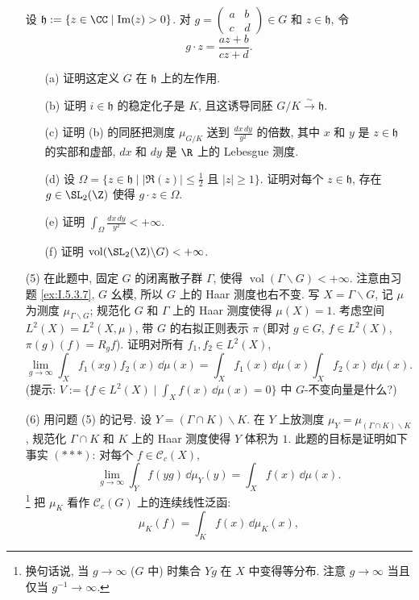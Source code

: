 \begin{enumerate}
设 $\mathfrak{h} := \{z \in \CC \mid \Im(z) > 0\}$.
对 $g = \begin{pmatrix} a & b \\ c & d \end{pmatrix} \in G$ 和 $z \in \mathfrak{h}$, 令
\[
g \cdot z = \frac{az + b}{cz + d}.
\]
\begin{enumerate}
\item[(a)] 证明这定义 $G$ 在 $\mathfrak{h}$ 上的左作用.
\item[(b)] 证明 $i \in \mathfrak{h}$ 的稳定化子是 $K$, 且这诱导同胚 $G/K \xrightarrow{\sim} \mathfrak{h}$.
\item[(c)] 证明 (b) 的同胚把测度 $\mu_{G/K}$ 送到 $\frac{dx\,dy}{y^2}$ 的倍数, 其中 $x$ 和 $y$ 是 $z \in \mathfrak{h}$ 的实部和虚部, $dx$ 和 $dy$ 是 $\R$ 上的 Lebesgue 测度.
\item[(d)] 设 $\Omega = \{z \in \mathfrak{h} \mid |\Re(z)| \leq \frac{1}{2} \text{ 且 } |z| \geq 1\}$. 证明对每个 $z \in \mathfrak{h}$, 存在 $g \in \SL_2(\Z)$ 使得 $g \cdot z \in \Omega$.
\item[(e)] 证明 $\int_{\Omega}\frac{dx\,dy}{y^2} < +\infty$.
\item[(f)] 证明 $\operatorname{vol}(\SL_2(\Z)\backslash G) < +\infty$.
\end{enumerate}
\item[(5)] 在此题中, 固定 $G$ 的闭离散子群 $\Gamma$, 使得 $\operatorname{vol}(\Gamma\backslash G) < +\infty$. 注意由习题 \ref{ex:I.5.3.7}, $G$ 幺模, 所以 $G$ 上的 Haar 测度也右不变. 写 $X = \Gamma\backslash G$, 记 $\mu$ 为测度 $\mu_{\Gamma\backslash G}$; 规范化 $G$ 和 $\Gamma$ 上的 Haar 测度使得 $\mu(X) = 1$. 考虑空间 $L^2(X) = L^2(X, \mu)$, 带 $G$ 的右拟正则表示 $\pi$ (即对 $g \in G$, $f \in L^2(X)$, $\pi(g)(f) = R_gf$).
证明对所有 $f_1, f_2 \in L^2(X)$,
\[
\lim_{g \to \infty}\int_X f_1(xg)f_2(x)\,\dd\mu(x) = \int_X f_1(x)\,\dd\mu(x)\int_X f_2(x)\,\dd\mu(x).
\]
(提示: $V := \{f \in L^2(X) \mid \int_X f(x)\,\dd\mu(x) = 0\}$ 中 $G$-不变向量是什么?)
\item[(6)] 用问题 (5) 的记号. 设 $Y = (\Gamma \cap K)\backslash K$. 在 $Y$ 上放测度 $\mu_Y = \mu_{(\Gamma\cap K)\backslash K}$, 规范化 $\Gamma \cap K$ 和 $K$ 上的 Haar 测度使得 $Y$ 体积为 $1$.
此题的目标是证明如下事实 $(***)$: 对每个 $f \in \mathcal{C}_c(X)$,
\[
\lim_{g \to \infty}\int_Y f(yg)\,\dd\mu_Y(y) = \int_X f(x)\,\dd\mu(x).
\]
\footnote{换句话说, 当 $g \to \infty$ ($G$ 中) 时集合 $Yg$ 在 $X$ 中变得等分布. 注意 $g \to \infty$ 当且仅当 $g^{-1} \to \infty$.}
把 $\mu_K$ 看作 $\mathcal{C}_c(G)$ 上的连续线性泛函:
\[
\mu_K(f) = \int_K f(x)\,\dd\mu_K(x),
\]
\end{enumerate}
